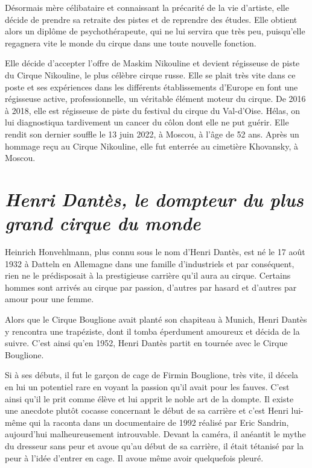Désormais mère célibataire et connaissant la précarité de la vie d’artiste, elle décide de prendre sa retraite des pistes et de reprendre des études. Elle obtient alors un diplôme de psychothérapeute, qui ne lui servira que très peu, puisqu'elle regagnera vite le monde du cirque dans une toute nouvelle fonction.	

Elle décide d’accepter l’offre de Maskim Nikouline et devient régisseuse de piste du Cirque Nikouline, le plus célèbre cirque russe. Elle se plait très vite dans ce poste et ses expériences dans les différents établissements d’Europe en font une régisseuse active, professionnelle, un véritable élément moteur du cirque. De 2016 à 2018, elle est régisseuse de piste du festival du cirque du Val-d'Oise. Hélas, on lui diagnostiqua tardivement un cancer du côlon dont elle ne put guérir. Elle rendit son dernier souffle le 13 juin 2022, à Moscou, à l'âge de 52 ans. Après un hommage reçu au Cirque Nikouline, elle fut enterrée au cimetière Khovansky, à Moscou.

\section*{\textit{Henri Dantès, le dompteur du plus grand cirque du monde }}
{}
Heinrich Honvehlmann, plus connu sous le nom d’Henri Dantès, est né le 17 août 1932 à Datteln en Allemagne dans une famille d’industriels et par conséquent, rien ne le prédisposait à la prestigieuse carrière qu’il aura au cirque. Certains hommes sont arrivés au cirque par passion, d’autres par hasard et d’autres par amour pour une femme.

Alors que le Cirque Bouglione avait planté son chapiteau à Munich, Henri Dantès y rencontra une trapéziste, dont il tomba éperdument amoureux et décida de la suivre. C’est ainsi qu’en 1952, Henri Dantès partit en tournée avec le Cirque Bouglione.

Si à ses débuts, il fut le garçon de cage de Firmin Bouglione, très vite, il décela en lui un potentiel rare en voyant la passion qu’il avait pour les fauves. C’est ainsi qu'il le prit comme élève et lui apprit le noble art de la dompte. Il existe une anecdote plutôt cocasse concernant le début de sa carrière et c’est Henri lui-même qui la raconta dans un documentaire de 1992 réalisé par Eric Sandrin, aujourd’hui malheureusement introuvable. Devant la caméra, il anéantit le mythe du dresseur sans peur et avoue qu’au début de sa carrière, il était tétanisé par la peur à l’idée d’entrer en cage. Il avoue même avoir quelquefois pleuré.

